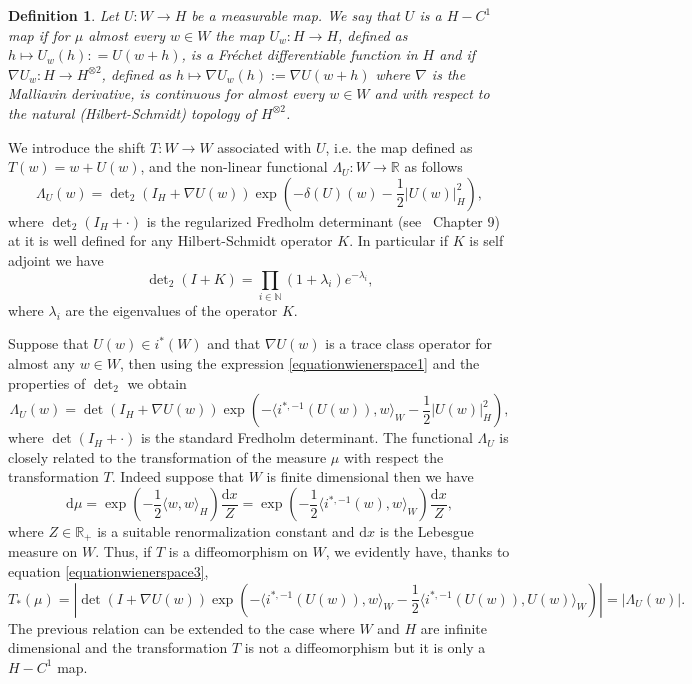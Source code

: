 \documentclass[a4paper,10pt]{article}
\newcommand{\assign}{:=}
\newcommand{\asterisk}{\mathord{*}}
\newcommand{\mathd}{\mathrm{d}}
\newtheorem{definition}{Definition}
\begin{document}
\begin{definition}
  Let $U : W \rightarrow H$ be a measurable map. We say that $U$ is a $H -
  C^1$ map if for $\mu$ almost every $w \in W$ the map $U_w : H \rightarrow
  H$, defined as $h \longmapsto U_w (h) : = U (w + h)$, is a Fr{\'e}chet
  differentiable function in $H$ and if $\nabla U_w : H \rightarrow H^{\otimes
  2}$, defined as $h \longmapsto \nabla U_w (h) \assign \nabla U (w + h)$
  where $\nabla$ is the Malliavin derivative, is continuous for almost every
  $w \in W$ and with respect to the natural (Hilbert-Schmidt) topology of
  $H^{\otimes 2}$.
\end{definition}

We introduce the shift $T : W \rightarrow W$ associated with $U$, i.e. the map
defined as $T (w) = w + U (w)$, and the non-linear functional $\Lambda_U : W
\rightarrow \mathbb{R}$ as follows
\begin{equation}
  \Lambda_U (w) = \det\nolimits_2 (I_H + \nabla U (w)) \exp \left( - \delta (U) (w) -
  \frac{1}{2} | U (w) |_H^2 \right), \label{equationwienerspace2}
\end{equation}
where $\det\nolimits_2 (I_H + \cdot)$ is the regularized Fredholm determinant
(see~{\cite{Simon2005}} Chapter 9) at it is well defined for any
Hilbert-Schmidt operator $K$. In particular if $K$ is self adjoint we have
\[ \det\nolimits_2 (I + K) = \prod_{i \in \mathbb{N}} (1 + \lambda_i) e^{- \lambda_i},
\]
where $\lambda_i$ are the eigenvalues of the operator $K$.

Suppose that $U (w) \in i^{\asterisk} (W)$ and that $\nabla U (w)$ is a trace
class operator for almost any $w \in W$, then using the expression
{\eqref{equationwienerspace1}} and the properties of $\det\nolimits_2$ we obtain
\begin{equation}
  \Lambda_U (w) = \det (I_H + \nabla U (w)) \exp \left( - \langle
  i^{\asterisk, - 1} (U (w)), w \rangle_W - \frac{1}{2} | U (w) |^2_H \right)
  \label{equationwienerspace3},
\end{equation}
where $\det (I_H + \cdot)$ is the standard Fredholm determinant. The
functional $\Lambda_U$ is closely related to the transformation of the measure
$\mu$ with respect the transformation $T$. Indeed suppose that $W$ is finite
dimensional then we have
\[ \mathd \mu = \exp \left( - \frac{1}{2} \langle w, w \rangle_H \right)
   \frac{\mathd x}{Z} = \exp \left( - \frac{1}{2} \langle i^{\asterisk, - 1}
   (w), w \rangle_W \right) \frac{\mathd x}{Z}, \]
where $Z \in \mathbb{R}_+$ is a suitable renormalization constant and $\mathd
x$ is the Lebesgue measure on $W$. Thus, if $T$ is a diffeomorphism on $W$, we
evidently have, thanks to equation {\eqref{equationwienerspace3}},
\[ T_{\asterisk} (\mu) = \left| \det (I + \nabla U (w)) \exp \left( - \langle
   i^{\asterisk, - 1} (U (w)), w \rangle_W - \frac{1}{2} \langle i^{\asterisk,
   - 1} (U (w)), U (w) \rangle_W \right) \right| = | \Lambda_U (w) | . \]
The previous relation can be extended to the case where $W$ and $H$ are
infinite dimensional and the transformation $T$ is not a diffeomorphism but it
is only a $H - C^1$ map.
\end{document}
